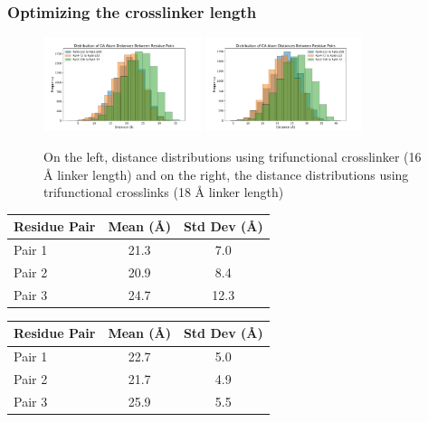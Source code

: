 \documentclass[a4paper,8pt]{beamer}
\begin{document}
\begin{frame}
\frametitle{Optimizing the crosslinker length}
\begin{figure}
\centering
\includegraphics[width=0.41\textwidth]{test-figures/tri-16.pdf}
\includegraphics[width=0.41\textwidth]{test-figures/18-tri.pdf}
\caption{On the left, distance distributions using trifunctional crosslinker 
(16 {\AA} linker length) and on the right, the distance distributions 
using trifunctional crosslinks (18 {\AA} linker length)}
\end{figure}
%
\begin{minipage}{0.48\textwidth}
  \centering
  \begin{tabular}{lcc}
  \hline
  Residue Pair & Mean (Å) & Std Dev (Å) \\
  \hline
  Pair 1 & 21.3 & 7.0 \\
  Pair 2 & 20.9 & 8.4 \\
  Pair 3 & 24.7 & 12.3 \\
  \hline
  \end{tabular}
  \end{minipage}
  \hfill
  \begin{minipage}{0.48\textwidth}
  \centering
  \begin{tabular}{lcc}
  \hline
  Residue Pair & Mean (Å) & Std Dev (Å) \\
  \hline
  Pair 1 & 22.7 & 5.0 \\
  Pair 2 & 21.7 & 4.9 \\
  Pair 3 & 25.9 & 5.5 \\
  \hline
  \end{tabular}
  \end{minipage}

\end{frame}
\end{document}
